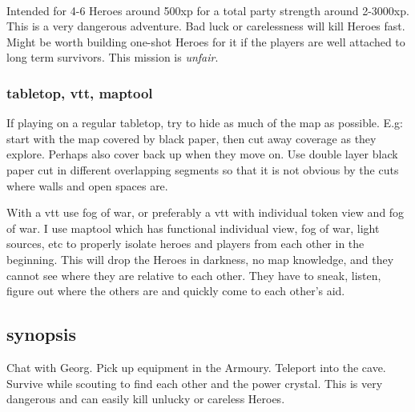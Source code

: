 \

Intended for 4-6 Heroes around 500xp for a total party strength around 2-3000xp. This is a very dangerous adventure. Bad luck or carelessness will kill Heroes fast. Might be worth building one-shot Heroes for it if the players are well attached to long term survivors. This mission is \emph{unfair}.




\vspace{1.0\baselineskip}
\tableofcontents
{}
\vspace{2.0\baselineskip}




\subsubsection*{tabletop, vtt, maptool}
If playing on a regular tabletop, try to hide as much of the map as possible. E.g: start with the map covered by black paper, then cut away coverage as they explore. Perhaps also cover back up when they move on. Use double layer black paper cut in different overlapping segments so that it is not obvious by the cuts where walls and open spaces are.

With a vtt use fog of war, or preferably a vtt with individual token view and fog of war. I use maptool which has functional individual view, fog of war, light sources, etc to properly isolate heroes and players from each other in the beginning. This will drop the Heroes in darkness, no map knowledge, and they cannot see where they are relative to each other. They have to sneak, listen, figure out where the others are and quickly come to each other's aid.








\clearpage
\subsection*{synopsis}
Chat with Georg. Pick up equipment in the Armoury. Teleport into the cave. Survive while scouting to find each other and the power crystal. This is very dangerous and can easily kill unlucky or careless Heroes.

